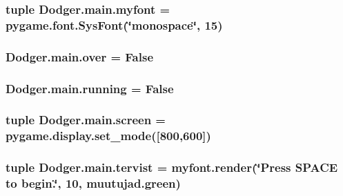 \subsubsection[{myfont}]{\setlength{\rightskip}{0pt plus 5cm}tuple Dodger.\+main.\+myfont = pygame.\+font.\+Sys\+Font(\char`\"{}monospace\char`\"{}, 15)}\label{namespace_dodger_1_1main_a5a2e204b9d9a091c33208dd3657e1307}
\hypertarget{namespace_dodger_1_1main_a13868600ce1e836d5d3e848a5932231d}{}
\subsubsection[{over}]{\setlength{\rightskip}{0pt plus 5cm}Dodger.\+main.\+over = False}\label{namespace_dodger_1_1main_a13868600ce1e836d5d3e848a5932231d}
\hypertarget{namespace_dodger_1_1main_a2c62876655c9247b65a382ebe35239a8}{}
\subsubsection[{running}]{\setlength{\rightskip}{0pt plus 5cm}Dodger.\+main.\+running = False}\label{namespace_dodger_1_1main_a2c62876655c9247b65a382ebe35239a8}
\hypertarget{namespace_dodger_1_1main_aae789c71f775508744848c9b4163b416}{}
\subsubsection[{screen}]{\setlength{\rightskip}{0pt plus 5cm}tuple Dodger.\+main.\+screen = pygame.\+display.\+set\+\_\+mode(\mbox{[}800,600\mbox{]})}\label{namespace_dodger_1_1main_aae789c71f775508744848c9b4163b416}
\hypertarget{namespace_dodger_1_1main_aada8d7b289e64fa2cd4da076de1f23c2}{}
\subsubsection[{tervist}]{\setlength{\rightskip}{0pt plus 5cm}tuple Dodger.\+main.\+tervist = myfont.\+render(\char`\"{}Press S\+P\+A\+C\+E to begin.\char`\"{}, 10, muutujad.\+green)}\label{namespace_dodger_1_1main_aada8d7b289e64fa2cd4da076de1f23c2}
\hypertarget{namespace_dodger_1_1main_ab3023da733d7bcce7908efc9e646a3d1}{}
